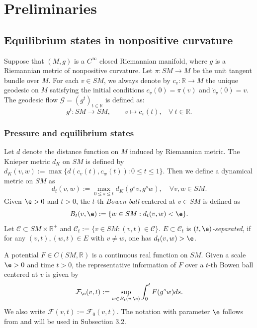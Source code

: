 \documentclass[11pt]{amsart}
\theoremstyle{definition}
\newcommand{\CC}{\mathbb{C}}
\def\CC{{\mathcal C}}
\newcommand{\F}{\mathcal{F}}
\def\CG{{\mathcal G}}
\def\RR{{\mathbb R}}
\begin{document}
\section{Preliminaries}

\subsection{Equilibrium states in nonpositive curvature}
Suppose that $(M,g)$ is a $C^{\infty}$ closed Riemannian manifold,
where $g$ is a Riemannian metric of nonpositive curvature. Let $\pi: SM\to M$ be the unit tangent bundle over $M$. For each $v\in SM$,
we always denote by $c_{v}: \RR\to M$ the unique geodesic on $M$ satisfying the initial conditions $c_v(0)=\pi(v)$ and $\dot c_v(0)=v$. The geodesic flow $\CG=(g^{t})_{t\in\mathbb{R}}$ is defined as:
\[
g^{t}: SM \rightarrow SM, \qquad v \mapsto \dot c_{v}(t),\ \ \ \ \forall\ t\in \RR .
\]

\subsubsection{Pressure and equilibrium states}
Let $d$ denote the distance function on $M$ induced by Riemannian metric. The Knieper metric $d_K$ on $SM$ is defined by 
$d_K(v,w):=\max\{d(c_v(t),c_w(t)): 0\le t\le 1\}$. Then we define a dynamical metric on $SM$ as
 $$d_t(v,w):=\max_{0\le s\le t}d_K(g^sv, g^sw), \quad \forall v,w\in SM.$$
Given $\e>0$ and $t>0$, the $t$-th \emph{Bowen ball} centered at $v\in SM$ is defined as
 $$B_t(v,\e):=\{w\in SM: d_t(v,w)<\e\}.$$
Let $\mathcal{C}\subset SM\times \mathbb{R}^+$ and $\CC_t:=\{v\in SM: (v,t)\in \CC\}$. $E\subset \mathcal{C}_t$ is \emph{$(t,\e)$-separated}, if for any $(v,t), (w,t)\in E$ with $v\neq w$, one has $d_t(v,w)>\e$. 

A potential $F\in C(SM, \mathbb{R})$ is a continuous real function on $SM$. Given a scale $\e>0$ and time $t>0$, the representative information of $F$ over a $t$-th Bowen ball centered at $v$ is given by
$$
\F_{\e}(v,t):=\sup_{w\in B_t(v,\e)}\int_0^t F(g^sw)ds.
$$
We also write $\F(v,t):=\F_0(v,t)$. The notation with parameter $\e$ follows from \cite{CT16} and will be used in Subsection 3.2.
\end{document}
